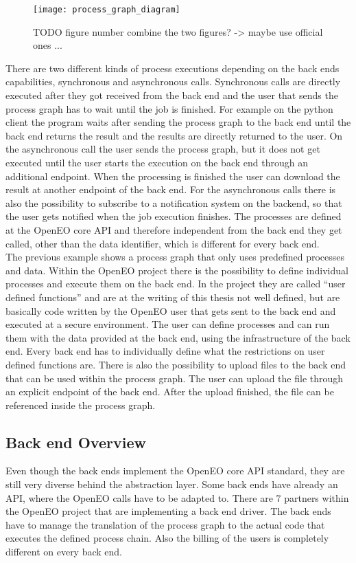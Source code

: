 \documentclass[draft,final]{vutinfth} %
\begin{document}
\begin{figure}[h]
	\centering
	\texttt{[image: process\_graph\_diagram]}
	\caption{TODO figure number combine the two figures? -> maybe use official ones ...}
	\label{fig:process_graph_diagram} %
\end{figure}
There are two different kinds of process executions depending on the back ends capabilities, synchronous and asynchronous calls. Synchronous calls are directly executed after they got received from the back end and the user that sends the process graph has to wait until the job is finished. For example on the python client the program waits after sending the process graph to the back end until the back end returns the result and the results are directly returned to the user. On the asynchronous call the user sends the process graph, but it does not get executed until the user starts the execution on the back end through an additional endpoint. When the processing is finished the user can download the result at another endpoint of the back end. For the asynchronous calls there is also the possibility to subscribe to a notification system on the backend, so that the user gets notified when the job execution finishes.     
The processes are defined at the OpenEO core API and therefore independent from the back end they get called, other than the data identifier, which is different for every back end.  
\\
The previous example shows a process graph that only uses predefined processes and data. Within the OpenEO project there is the possibility to define individual processes and execute them on the back end. In the project they are called “user defined functions” and are at the writing of this thesis not well defined, but are basically code written by the OpenEO user that gets sent to the back end and executed at a secure environment. The user can define processes and can run them with the data provided at the back end, using the infrastructure of the back end. Every back end has to individually define what the restrictions on user defined functions are. 
There is also the possibility to upload files to the back end that can be used within the process graph. The user can upload the file through an explicit endpoint of the back end. After the upload finished, the file can be referenced inside the process graph.\cite{eodc_github}

\subsection{Back end Overview}\label{Back end Overview}
Even though the back ends implement the OpenEO core API standard, they are still very diverse behind the abstraction layer. Some back ends have already an API, where the OpenEO calls have to be adapted to. There are 7 partners within the OpenEO project that are implementing a back end driver. The back ends have to manage the translation of the process graph to the actual code that executes the defined process chain. Also the billing of the users is completely different on every back end. 
\end{document}
